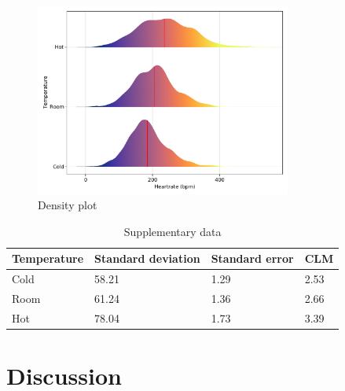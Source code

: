 \documentclass[a4paper, british]{article}
\begin{document}
\begin{figure}[htb]
    \centering
    \includegraphics[width=0.75\textwidth]{figures/plot2.pdf}
    \caption{Density plot}
    \label{fig:density}
\end{figure}


\begin{table}[htb]
    \centering
    \begin{tabular}[]{llll}
        \addlinespace
        \toprule
        Temperature& Standard deviation & Standard error & CLM\\
        \midrule
        Cold &58.21&1.29& 2.53\\
        Room&61.24&1.36& 2.66\\
        Hot &78.04&1.73&3.39\\
        \bottomrule
    \end{tabular}
    \caption{Supplementary data}
    \label{table:1}
\end{table}


\section{Discussion}
\end{document}
